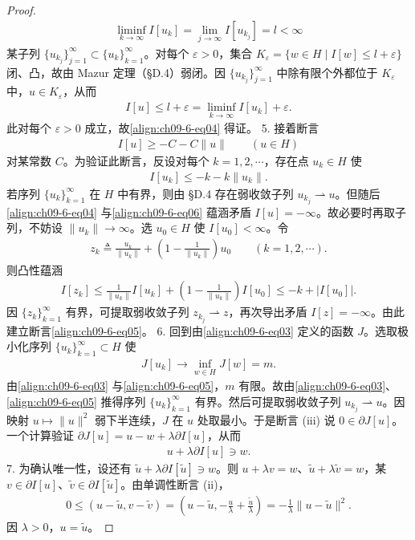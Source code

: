 \documentclass[../../main.tex]{subfiles}
\begin{document}
\begin{theorem}[次微分的性质]
\begin{proof}
\begin{align*}
\liminf_{k\to\infty}I[u_k]=\lim_{j\to\infty}I[u_{k_j}]=l<\infty
\end{align*}
某子列 $\{u_{k_j}\}_{j=1}^\infty\subset\{u_k\}_{k=1}^\infty$。对每个 $\varepsilon>0$，集合 $K_\varepsilon=\{w\in H\mid I[w]\leqslant l+\varepsilon\}$ 闭、凸，故由 Mazur 定理（\S D.4）弱闭。因 $\{u_{k_j}\}_{j=1}^\infty$ 中除有限个外都位于 $K_\varepsilon$ 中，$u\in K_\varepsilon$，从而
\begin{align*}
I[u]\leqslant l+\varepsilon=\liminf_{k\to\infty}I[u_k]+\varepsilon.
\end{align*}
此对每个 $\varepsilon>0$ 成立，故\eqref{align:ch09-6-eq04} 得证。
5. 接着断言
\begin{align}
I[u]\geqslant-C-C\|u\|\qquad (u\in H)\label{align:ch09-6-eq05}
\end{align}
对某常数 $C$。为验证此断言，反设对每个 $k=1,2,\cdots$，存在点 $u_k\in H$ 使
\begin{align}
I[u_k]\leqslant-k-k\|u_k\|.\label{align:ch09-6-eq06}
\end{align}
若序列 $\{u_k\}_{k=1}^\infty$ 在 $H$ 中有界，则由 \S D.4 存在弱收敛子列 $u_{k_j}\rightharpoonup u$。但随后\eqref{align:ch09-6-eq04} 与\eqref{align:ch09-6-eq06} 蕴涵矛盾 $I[u]=-\infty$。故必要时再取子列，不妨设 $\|u_k\|\to\infty$。选 $u_0\in H$ 使 $I[u_0]<\infty$。令
\begin{align*}
z_k\triangleq\frac{u_k}{\|u_k\|}+\left(1-\frac1{\|u_k\|}\right)u_0\qquad (k=1,2,\cdots).
\end{align*}
则凸性蕴涵
\begin{align*}
I[z_k]\leqslant\frac1{\|u_k\|}I[u_k]+\left(1-\frac1{\|u_k\|}\right)I[u_0]\leqslant-k+|I[u_0]|.
\end{align*}
因 $\{z_k\}_{k=1}^\infty$ 有界，可提取弱收敛子列 $z_{k_j}\rightharpoonup z$，再次导出矛盾 $I[z]=-\infty$。由此建立断言\eqref{align:ch09-6-eq05}。
6. 回到由\eqref{align:ch09-6-eq03} 定义的函数 $J$。选取极小化序列 $\{u_k\}_{k=1}^\infty\subset H$ 使
\begin{align*}
J[u_k]\to\inf_{w\in H}J[w]=m.
\end{align*}
由\eqref{align:ch09-6-eq03} 与\eqref{align:ch09-6-eq05}，$m$ 有限。故由\eqref{align:ch09-6-eq03}、\eqref{align:ch09-6-eq05} 推得序列 $\{u_k\}_{k=1}^\infty$ 有界。然后可提取弱收敛子列 $u_{k_j}\rightharpoonup u$。因映射 $u\mapsto\|u\|^2$ 弱下半连续，$J$ 在 $u$ 处取最小。于是断言 (iii) 说 $0\in\partial J[u]$。一个计算验证 $\partial J[u]=u-w+\lambda\partial I[u]$，从而
\begin{align*}
u+\lambda\partial I[u]\ni w.
\end{align*}
7. 为确认唯一性，设还有 $\widetilde{u}+\lambda\partial I[\widetilde{u}]\ni w$。则 $u+\lambda v=w$、$\widetilde{u}+\lambda\widetilde{v}=w$，某 $v\in\partial I[u]$、$\widetilde{v}\in\partial I[\widetilde{u}]$。由单调性断言 (ii)，
\begin{align*}
0\leqslant(u-\widetilde{u},v-\widetilde{v})=\left(u-\widetilde{u},-\frac u\lambda+\frac{\widetilde{u}}\lambda\right)=-\frac1\lambda\|u-\widetilde{u}\|^2.
\end{align*}
因 $\lambda>0$，$u=\widetilde{u}$。
\end{proof}
\end{theorem}
\end{document}
